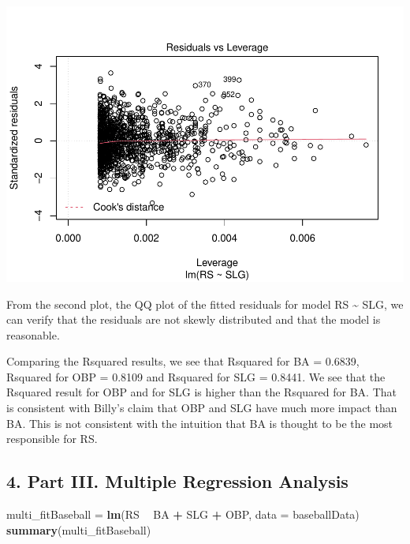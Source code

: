 \documentclass[
]{article}
\newenvironment{Shaded}{\begin{snugshade}}{\end{snugshade}}
\newcommand{\DataTypeTok}[1]{\textcolor[rgb]{0.13,0.29,0.53}{#1}}
\newcommand{\KeywordTok}[1]{\textcolor[rgb]{0.13,0.29,0.53}{\textbf{#1}}}
\newcommand{\NormalTok}[1]{#1}
\newcommand{\OperatorTok}[1]{\textcolor[rgb]{0.81,0.36,0.00}{\textbf{#1}}}
\newcommand{\StringTok}[1]{\textcolor[rgb]{0.31,0.60,0.02}{#1}}
\begin{document}
\includegraphics{HW2_Liu-Zi-Jian_files/figure-latex/unnamed-chunk-38-4.pdf}

From the second plot, the QQ plot of the fitted residuals for model RS
\textasciitilde{} SLG, we can verify that the residuals are not skewly
distributed and that the model is reasonable.

Comparing the Rsquared results, we see that Rsquared for BA = 0.6839,
Rsquared for OBP = 0.8109 and Rsquared for SLG = 0.8441. We see that the
Rsquared result for OBP and for SLG is higher than the Rsquared for BA.
That is consistent with Billy's claim that OBP and SLG have much more
impact than BA. This is not consistent with the intuition that BA is
thought to be the most responsible for RS.

\hypertarget{part-iii.-multiple-regression-analysis-1}{%
\subsection{4. Part III. Multiple Regression
Analysis}\label{part-iii.-multiple-regression-analysis-1}}

\begin{Shaded}
\begin{Highlighting}[]
\NormalTok{multi_fitBaseball =}\StringTok{ }\KeywordTok{lm}\NormalTok{(RS }\OperatorTok{~}\StringTok{ }\NormalTok{BA }\OperatorTok{+}\StringTok{ }\NormalTok{SLG }\OperatorTok{+}\StringTok{ }\NormalTok{OBP, }\DataTypeTok{data =}\NormalTok{ baseballData)}
\KeywordTok{summary}\NormalTok{(multi_fitBaseball)}
\end{Highlighting}
\end{Shaded}
\end{document}
